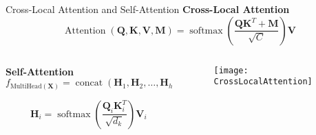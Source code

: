 \begin{frame}{Cross-Local Attention and Self-Attention}
	\small
	\textbf{Cross-Local Attention}
	\begin{equation*} \label{eq:attention}
		\operatorname{Attention}(\mathbf{Q}, \mathbf{K}, \mathbf{V}, \mathbf{M})=\operatorname{softmax}\left(\frac{\mathbf{Q} \mathbf{K}^{T}+\mathbf{M}}{\sqrt{C}}\right) \mathbf{V}
	\end{equation*}
	

	\begin{columns}
		
		\begin{column}{0.5\textwidth}
				\textbf{Self-Attention}
			$$
			f_{\text{MultiHead}(\mathbf{X})} = \operatorname{concat} \left( \mathbf{H}_1, \mathbf{H}_2, \dots, \mathbf{H}_h \right) \mathbf{W}_O
			$$
			
			$$
			\mathbf{H}_i = \operatorname{softmax} \left( \frac{\mathbf{Q}_i \mathbf{K}_i^T}{\sqrt{d_k}} \right) \mathbf{V}_i
			$$
		\end{column}
		
		\begin{column}{0.5\textwidth}
			\begin{figure}
				\centering
				\texttt{[image: CrossLocalAttention]}
			\end{figure}
		\end{column}
	\end{columns}

\end{frame}






%	
%	
%	
%	

